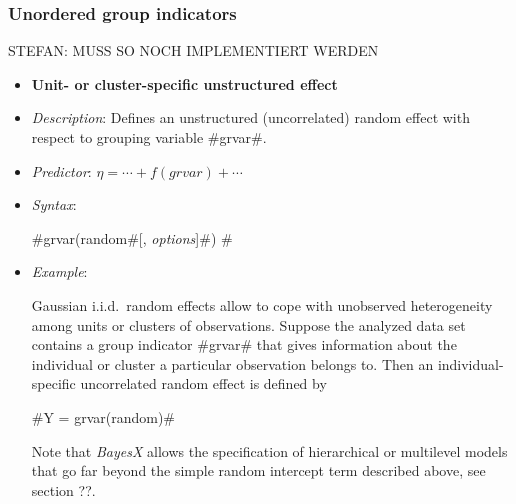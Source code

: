 \begin{itemize}
%
%
%
%
%
%
%
%
\end{itemize}


\subsubsection*{Unordered group indicators}

STEFAN: MUSS SO NOCH IMPLEMENTIERT WERDEN

\begin{itemize}
\item[]{\bf\sffamily Unit- or cluster-specific unstructured effect}

\item[] {\em Description}: Defines an unstructured (uncorrelated)
random effect with respect to grouping variable #grvar#. \item[]
{\em Predictor}: $\eta = \cdots + f(grvar) + \cdots$ \item[] {\em
Syntax}:

#grvar(random#[, {\em options}]#) #
\item[] {\em Example}:

Gaussian i.i.d.~random effects allow to cope with unobserved
heterogeneity among units or clusters of observations. Suppose the
analyzed data set contains a group indicator #grvar# that gives
information about the individual or cluster a particular
observation belongs to. Then an individual-specific uncorrelated
random effect is defined by

#Y = grvar(random)#

Note that {\em BayesX} allows the specification of hierarchical or multilevel models that go far beyond
the simple random intercept term described above, see section ??.
\end{itemize}



